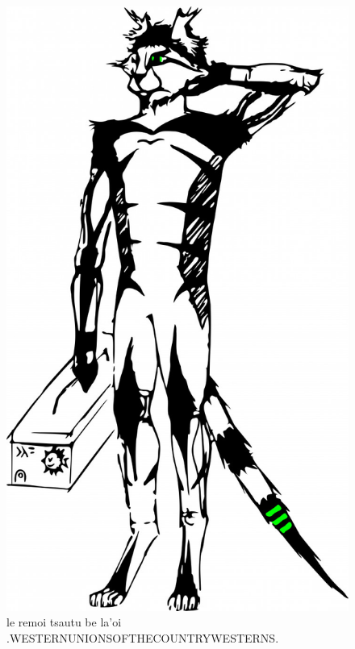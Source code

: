 \documentclass{report}
\begin{document}
\begin{figure}[ht]
	\centering
	\includegraphics[keepaspectratio, width=\textwidth, height=0.75\textheight]{50x/toolbox/s1v2.jpg}
	\caption[center]{le remoi tsautu be la'oi .WESTERNUNIONSOFTHECOUNTRYWESTERNS.}
\end{figure}
\end{document}
